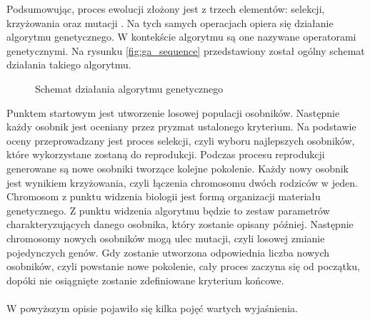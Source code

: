 \documentclass[twoside]{iisthesis}
\begin{document}
Podsumowując, proces ewolucji złożony jest z trzech elementów: selekcji, krzyżowania oraz mutacji \cite{ga_book}. Na tych samych operacjach opiera się działanie algorytmu genetycznego. W kontekście algorytmu są one nazywane operatorami genetycznymi. Na rysunku \eqref{fig:ga_sequence} przedstawiony został ogólny schemat działania takiego algorytmu.
\begin{figure}[!htb]
	\centering
	\caption{Schemat działania algorytmu genetycznego}
	\label{fig:ga_sequence}
\end{figure}

Punktem startowym jest utworzenie losowej populacji osobników. Następnie każdy osobnik jest oceniany przez pryzmat ustalonego kryterium. Na podstawie oceny przeprowadzany jest proces selekcji, czyli wyboru najlepszych osobników, które wykorzystane zostaną do reprodukcji. Podczas procesu reprodukcji generowane są nowe osobniki tworzące kolejne pokolenie. Każdy nowy osobnik jest wynikiem krzyżowania, czyli łączenia chromosomu dwóch rodziców w jeden. Chromosom z punktu widzenia biologii jest formą organizacji materiału genetycznego. Z punktu widzenia algorytmu będzie to zestaw parametrów charakteryzujących danego osobnika, który zostanie opisany później. Następnie chromosomy nowych osobników mogą ulec mutacji, czyli losowej zmianie pojedynczych genów. Gdy zostanie utworzona odpowiednia liczba nowych osobników, czyli powstanie nowe pokolenie, cały proces zaczyna się od początku, dopóki nie osiągnięte zostanie zdefiniowane kryterium końcowe.\\\\
W powyższym opisie pojawiło się kilka pojęć wartych wyjaśnienia.
\end{document}
